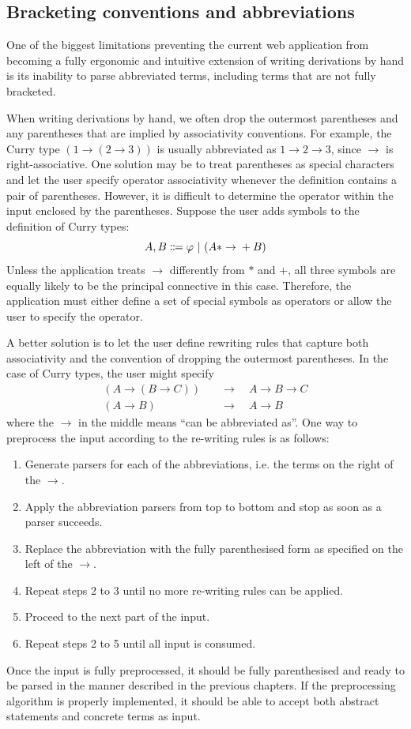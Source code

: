 \subsection{Bracketing conventions and abbreviations}
One of the biggest limitations preventing the current web application from becoming a fully ergonomic and intuitive extension of writing derivations by hand is its inability to parse abbreviated terms, including terms that are not fully bracketed.

When writing derivations by hand, we often drop the outermost parentheses and any parentheses that are implied by associativity conventions. For example, the Curry type $(1 \to (2 \to 3))$ is usually abbreviated as $1 \to 2 \to 3$, since $\to$ is right-associative. One solution may be to treat parentheses as special characters and let the user specify operator associativity whenever the definition contains a pair of parentheses. However, it is difficult to determine the operator within the input enclosed by the parentheses. Suppose the user adds symbols to the definition of Curry types:
\[
    A, B \Coloneqq \varphi \ |\  (A* \to{} +B)
\]
Unless the application treats $\to$ differently from $*$ and $+$, all three symbols are equally likely to be the principal connective in this case. Therefore, the application must either define a set of special symbols as operators or allow the user to specify the operator.

A better solution is to let the user define rewriting rules that capture both associativity and the convention of dropping the outermost parentheses. In the case of Curry types, the user might specify
\begin{align*}
    (A \to (B \to C)) \quad &\to \quad A \to B \to C \\
    (A \to B) \quad &\to \quad A \to B
\end{align*}
where the $\to$ in the middle means ``can be abbreviated as''. One way to preprocess the input according to the re-writing rules is as follows:
\begin{enumerate}
    \item Generate parsers for each of the abbreviations, i.e. the terms on the right of the $\to$.
    \item Apply the abbreviation parsers from top to bottom and stop as soon as a parser succeeds.
    \item Replace the abbreviation with the fully parenthesised form as specified on the left of the $\to$.
    \item Repeat steps 2 to 3 until no more re-writing rules can be applied.
    \item Proceed to the next part of the input.
    \item Repeat steps 2 to 5 until all input is consumed.
\end{enumerate}
Once the input is fully preprocessed, it should be fully parenthesised and ready to be parsed in the manner described in the previous chapters. If the preprocessing algorithm is properly implemented, it should be able to accept both abstract statements and concrete terms as input.

